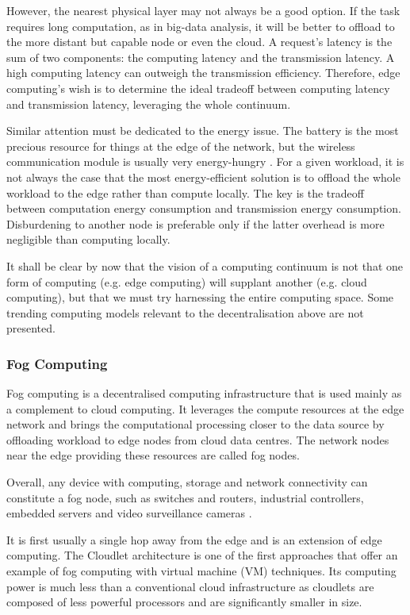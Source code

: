 \documentclass{ieeeaccess}
\begin{document}
However, the nearest physical layer may not always be a good option. If the task requires long computation, as in big-data analysis, it will be better to offload to the more distant but capable node or even the cloud. A request's latency is the sum of two components: the computing latency and the transmission latency. A high computing latency can outweigh the transmission efficiency. Therefore, edge computing's wish is to determine the ideal tradeoff between computing latency and transmission latency, leveraging the whole continuum.

Similar attention must be dedicated to the energy issue. The battery is the most precious resource for things at the edge of the network, but the wireless communication module is usually very energy-hungry \cite{edge-computing-vision-challenges}. For a given workload, it is not always the case that the most energy-efficient solution is to offload the whole workload to the edge rather than compute locally. The key is the tradeoff between computation energy consumption and transmission energy consumption. Disburdening to another node is preferable only if the latter overhead is more negligible than computing locally.

It shall be clear by now that the vision of a computing continuum is not that one form of computing (e.g. edge computing) will supplant another (e.g. cloud computing), but that we must try harnessing the entire computing space. Some trending computing models relevant to the decentralisation above are not presented.

\subsubsection{Fog Computing}

Fog computing \cite{fog-computing} is a decentralised computing infrastructure that is used mainly as a complement to cloud computing. It leverages the compute resources at the edge network and brings the computational processing closer to the data source by offloading workload to edge nodes from cloud data centres. The network nodes near the edge providing these resources are called fog nodes.

Overall, any device with computing, storage and network connectivity can constitute a fog node, such as switches and routers, industrial controllers, embedded servers and video surveillance cameras \cite{camera-virtualisation}.

It is first usually a single hop away from the edge and is an extension of edge computing. The Cloudlet \cite{cloudlet} architecture is one of the first approaches that offer an example of fog computing with virtual machine (VM) techniques. Its computing power is much less than a conventional cloud infrastructure as cloudlets are composed of less powerful processors and are significantly smaller in size.
\end{document}
